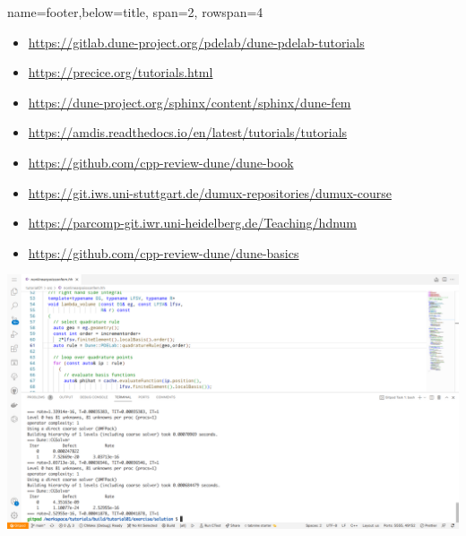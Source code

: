 \documentclass[
	paper=a0,%
	style=ruled, %
	]{bfhsciposter}
\newcommand{\tbs}{\textbackslash}
\let\code\texttt
\newcommand*{\macro}[1]{\code{\tbs#1}}
\begin{document}
\begin{tcbposter}[
		poster={
				columns=4,
				rows=7,
				spacing=1cm,
			},]
\begin{posterboxenv}[title=Tutorials running available on Gitpod]{name=footer,below=title, span=2, rowspan=4}
		\begin{itemize}
			\item \url{https://gitlab.dune-project.org/pdelab/dune-pdelab-tutorials}
			\item \url{https://precice.org/tutorials.html}
			\item \url{https://dune-project.org/sphinx/content/sphinx/dune-fem}
			\item \url{https://amdis.readthedocs.io/en/latest/tutorials/tutorials}
			\item \url{https://github.com/cpp-review-dune/dune-book}
			\item \url{https://git.iws.uni-stuttgart.de/dumux-repositories/dumux-course}
			\item \url{https://parcomp-git.iwr.uni-heidelberg.de/Teaching/hdnum}
			\item \url{https://github.com/cpp-review-dune/dune-basics}
		\end{itemize}

		\includegraphics[width=\linewidth]{gitpod-working}
	\end{posterboxenv}


\end{tcbposter}
\end{document}
